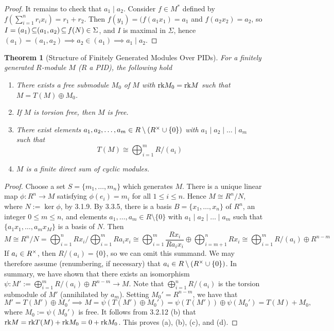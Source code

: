 \documentclass[11pt]{book}
\newcounter{counter}
\newtheorem{theorem}[counter]{Theorem}   \newtheorem*{theorem*}{Theorem}   \newtheorem{lemma}[counter]{Lemma}   \newtheorem{corollary}[counter]{Corollary}
\theoremstyle{definition}   \newtheorem{defn}[counter]{Definition} %
\newcommand{\bs}{\setminus}   \newcommand{\A}{\mathcal{A}}   \newcommand{\sy}{\textnormal{Syl}}   \newcommand{\size}[1]{\left| #1 \right|}
\DeclareMathOperator{\ra}{\rightarrow}   \DeclareMathOperator{\Poly}{\mathbf{P}}   \DeclareMathOperator{\spn}{\textnormal{span}}   \DeclareMathOperator{\aut}{\textnormal{Aut}}
\numberwithin{counter}{chapter}
\begin{document}
\begin{proof}
It remains to check that $a_1 \mid a_2$. Consider $f \in M^*$ defined by $f(\sum_{i=1}^n r_i x_i) = r_1 + r_2$. Then $f(y_1) = (f(a_1x_1) = a_1$ and $f(a_2 x_2) = a_2$, so $I = (a_1) \operatorname{\subseteq} (a_1,a_2) \operatorname{\subseteq} f(N) \in \Sigma$, and $I$ is maximal in $\Sigma$, hence $(a_1) = (a_1,a_2) \implies a_2 \in (a_1) \implies a_1 \mid a_2$. 
\end{proof}

\newpage

\begin{theorem}[Structure of Finitely Generated Modules Over PIDs]
For a finitely generated $R$-module $M$ ($R$ a PID), the following hold
\begin{enumerate}
\item[(a)] There exists a free submodule $M_0$ of $M$ with $\textnormal{rk} M_0 = \textnormal{rk} M$ such that $M = T(M) \oplus M_0$.
\item[(b)] If $M$ is torsion free, then $M$ is free.
\item[(c)] There exist elements $a_1,a_2,\dots,a_m \in R\bs(R\x \cup \{0\})$ with $a_1 \mid a_2 \mid \dots \mid a_m$ such that 
	\[T(M) \cong \bigoplus_{i=1}^m R/(a_i) \]
\item[(d)] $M$ is a finite direct sum of cyclic modules.
\end{enumerate}
\end{theorem}

\begin{proof}
Choose a set $S = \{m_1,\dots,m_n\}$ which generates $M$. There is a unique linear map $\phi : R^n \ra M$ satisfying $\phi(e_i) = m_i$ for all $1 \leq i \leq n$. Hence $M \cong R^n/N$, where $N := \ker \phi$, by 3.1.9. By 3.3.5, there is a basis $B = \{x_1,\dots,x_n\}$ of $R^n$, an integer $0 \leq m \leq n$, and elements $a_1,\dots,a_m \in R \bs \{0\}$ with $a_1 \mid a_2 \mid \dots \mid a_m$ such that $\{a_1x_1,\dots,a_mx_M\}$ is a basis of $N$. Then
	\[M \cong R^n/N = \bigoplus_{i=1}^n Rx_i/\bigoplus_{i=1}^m Ra_ix_i \cong \bigoplus_{i=1}^m \frac{Rx_i}{Ra_ix_i} \oplus \bigoplus_{i=m+1}^n Rx_i \cong \bigoplus_{i=1}^m R/(a_i) \oplus R^{n-m} \]
If $a_i \in R^{\times}$, then $R/(a_i) = \{0\}$, so we can omit this summand. We may therefore assume (renumbering, if necessary) that $a_i \in R \bs (R\x \cup \{0\})$. In summary, we have shown that there exists an isomorphism $\psi : M' := \bigoplus_{i=1}^m R/(a_i) \oplus R^{n-m} \ra M$. Note that $\bigoplus_{i=1}^n R/(a_i)$ is the torsion submodule of $M'$ (annihilated by $a_m$). Setting $M_0' = R^{n-m}$, we have that 
	\[M' = T(M') \oplus M_0' \implies M = \psi(T(M') \oplus M_0') = \psi(T(M')) \oplus \psi(M_0') = T(M) + M_0, \]
where $M_0 := \psi(M_0')$ is free. It follows from 3.2.12 (b) that $\textnormal{rk} M = \textnormal{rk} T(M) + \textnormal{rk} M_0 = 0 + \textnormal{rk} M_0$. This proves (a), (b), (c), and (d).
\end{proof}
\end{document}
